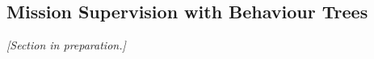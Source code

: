 \subsection{Mission Supervision with Behaviour Trees}
\label{sec:phaseA_mission}

\emph{[Section in preparation.]}
